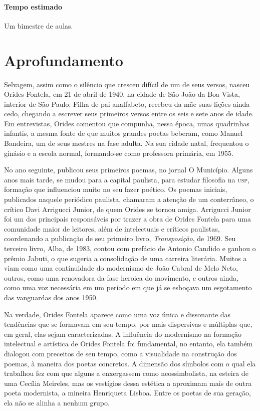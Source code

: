 \documentclass[12pt]{extarticle}
\begin{document}
\paragraph{Tempo estimado} Um bimestre de aulas.

\section{Aprofundamento}

Selvagem, assim como o silêncio que cresceu difícil de um de seus
versos, nasceu Orides Fontela, em 21 de abril de 1940, na cidade de São
João da Boa Vista, interior de São Paulo. Filha de pai analfabeto,
recebeu da mãe suas lições ainda cedo, chegando a escrever seus
primeiros versos entre os seis e sete anos de idade. Em entrevistas,
Orides comentou que compunha, nessa época, umas quadrinhas infantis, a
mesma fonte de que muitos grandes poetas beberam, como Manuel Bandeira,
um de seus mestres na fase adulta. Na sua cidade natal, frequentou o
ginásio e a escola normal, formando-se como professora primária, em
1955.

No ano seguinte, publicou seus primeiros poemas, no jornal O Município.
Alguns anos mais tarde, se mudou para a capital paulista, para estudar
filosofia na \textsc{usp}, formação que influenciou muito no seu fazer poético.
Os poemas iniciais, publicados naquele periódico paulista, chamaram a
atenção de um conterrâneo, o crítico Davi Arrigucci Junior, de quem
Orides se tornou amiga. Arrigucci Junior foi um dos principais
responsáveis por trazer a obra de Orides Fontela para uma comunidade
maior de leitores, além de intelectuais e críticos paulistas,
coordenando a publicação de seu primeiro livro, \emph{Transposição}, de
1969. Seu terceiro livro, Alba, de 1983, contou com prefácio de Antonio
Candido e ganhou o prêmio Jabuti, o que sugeria a consolidação de uma
carreira literária. Muitos a viam como uma continuidade do modernismo de
João Cabral de Melo Neto, outros, como uma renovadora da fase heroica do
movimento, e outros ainda, como uma voz necessária em um período em que
já se esboçava um esgotamento das vanguardas dos anos 1950.




Na verdade, Orides Fontela aparece como uma voz única e dissonante das
tendências que se formavam em seu tempo, por mais dispersivas e
múltiplas que, em geral, elas sejam caracterizadas. A influência do
modernismo na formação intelectual e artística de Orides Fontela foi
fundamental, no entanto, ela também dialogou com preceitos de seu tempo,
como a visualidade na construção dos poemas, à maneira dos poetas
concretos. A dimensão dos símbolos com o qual ela trabalhou fez com que
alguns a enxergassem como neossimbolista, na esteira de uma Cecília
Meireles, mas os vestígios dessa estética a aproximam mais de outra
poeta modernista, a mineira Henriqueta Lisboa. Entre os poetas de sua
geração, ela não se alinha a nenhum grupo.
\end{document}
